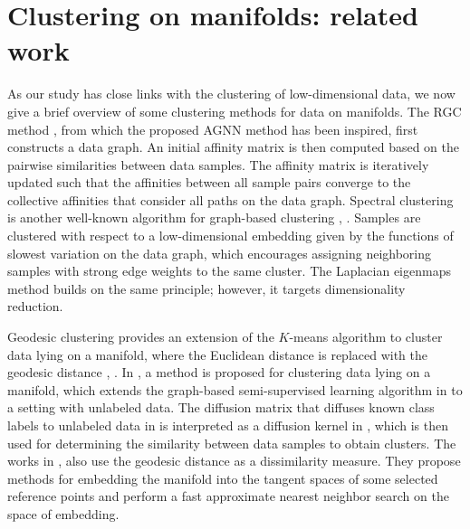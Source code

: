 \documentclass[journal]{IEEEtran}
\begin{document}
\section{Clustering on manifolds: related work}
\label{sec:related_work}

As our study has close links with the clustering of low-dimensional data, we now give a brief overview of some clustering methods for data on manifolds. 
The RGC method \cite{Donoser13replicator}, from which the proposed AGNN method has been inspired, first constructs a data graph. An initial affinity matrix is then computed based on the pairwise similarities between data samples. The affinity matrix is iteratively updated such that the affinities between all sample pairs converge to the collective affinities that consider all paths on the data graph. 
Spectral clustering is another well-known algorithm for graph-based clustering  \cite{Shi00normalized}, \cite{Uw01on}. Samples are clustered with respect to a low-dimensional embedding given by the functions of slowest variation on the data graph, which encourages assigning neighboring samples with strong edge weights to the same cluster. The Laplacian eigenmaps method \cite{Belkin03laplacian} builds on the same principle; however, it targets dimensionality reduction. 

Geodesic clustering provides an extension of the $K$-means algorithm to cluster data lying on a manifold, where the Euclidean distance is replaced with the geodesic distance \cite{Asgharbeygi2008}, \cite{Tu2014}. In \cite{Breitenbach2005}, a method is proposed for clustering data lying on a manifold, which extends the graph-based  semi-supervised learning algorithm in \cite{Zhou2004} to a setting with unlabeled data. The diffusion matrix that diffuses known class labels to unlabeled data in \cite{Zhou2004} is interpreted as a diffusion kernel in \cite{Breitenbach2005}, which is then used for determining the similarity between data samples to obtain clusters. The works in \cite{Turaga10nearest}, \cite{Chaudhry10fast} also use the geodesic distance as a dissimilarity measure. They propose methods for embedding the manifold into the tangent spaces of some selected reference points and perform a fast approximate nearest neighbor search on the space of embedding. 
\end{document}
